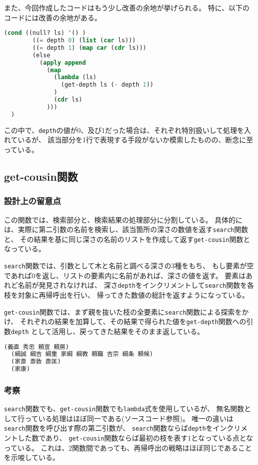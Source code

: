 \documentclass[11pt,a4paper, uplatex]{jsarticle}
\begin{document}
また、今回作成したコードはもう少し改善の余地が挙げられる。
特に、以下のコードには改善の余地がある。
\begin{lstlisting}[language=lisp, caption=\texttt{get-depth}関数一部]
  (cond ((null? ls) '() )
        ((= depth 0) (list (car ls)))
        ((= depth 1) (map car (cdr ls)))
        (else
          (apply append
            (map
              (lambda (ls)
                (get-depth ls (- depth 1))
              )
              (cdr ls)
            )))
  )
\end{lstlisting}
この中で、\texttt{depth}の値が0、及び1だった場合は、それぞれ特別扱いして処理を入れているが、
該当部分を1行で表現する手段がないか模索したものの、断念に至っている。

\subsection{get-cousin関数}
\subsubsection{設計上の留意点}
この関数では、検索部分と、検索結果の処理部分に分割している。
具体的には、実際に第二引数の名前を検索し、該当箇所の深さの数値を返す\texttt{search}関数と、
その結果を基に同じ深さの名前のリストを作成して返す\texttt{get-cousin}関数となっている。

\texttt{search}関数では、引数として木と名前と調べる深さの3種をもち、
もし要素が空であれば0を返し、リストの要素内に名前があれば、深さの値を返す。
要素はあれど名前が発見されなければ、
深さ\texttt{depth}をインクリメントして\texttt{search}関数を各枝を対象に再帰呼出を行い、
帰ってきた数値の総計を返すようになっている。

\texttt{get-cousin}関数では、まず親を抜いた枝の全要素に\texttt{search}関数による探索をかけ、
それぞれの結果を加算して、その結果で得られた値を\texttt{get-depth}関数への引数\texttt{depth}
として活用し、戻ってきた結果をそのまま返している。

\begin{lstlisting}[language=lisp, caption=\texttt{get-cousin}関数実行例]
  (義直 秀忠 頼宣 頼房)
  (綱誠 綱吉 綱重 家綱 綱教 頼職 吉宗 綱条 頼候)
  (家斎 斎敦 斎匡)
  (家康)
\end{lstlisting}
\subsubsection{考察}
\texttt{search}関数でも、\texttt{get-cousin}関数でも\texttt{lambda}式を使用しているが、
無名関数として行っている処理はほぼ同一である(ソースコード参照)。
唯一の違いは\texttt{search}関数を呼び出す際の第二引数が、
\texttt{search}関数ならば\texttt{depth}をインクリメントした数であり、
\texttt{get-cousin}関数ならば最初の枝を表す1となっている点となっている。
これは、2関数間であっても、再帰呼出の戦略はほぼ同じであることを示唆している。
\end{document}
